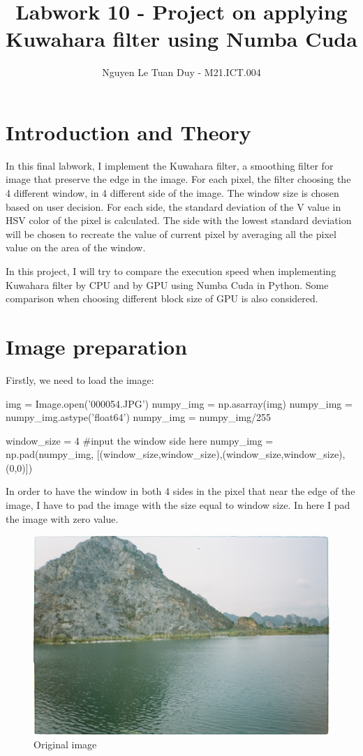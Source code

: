 \documentclass{article}
\title{Labwork 10 - Project on applying Kuwahara filter using Numba Cuda}
\author{Nguyen Le Tuan Duy - M21.ICT.004}
\date{}
\begin{document}
\maketitle
\section{Introduction and Theory}
In this final labwork, I implement the Kuwahara filter, a smoothing filter for image that preserve the edge in the image. For each pixel, the filter choosing the 4 different window, in 4 different side of the image. The window size is chosen based on user decision. For each side, the standard deviation of the V value in HSV color of the pixel is calculated. The side with the lowest standard deviation will be chosen to recreate the value of current pixel by averaging all the pixel value on the area of the window. 

In this project, I will try to compare the execution speed when implementing Kuwahara filter by CPU and by GPU using Numba Cuda in Python. Some comparison when choosing different block size of GPU is also considered.

\section{Image preparation}
Firstly, we need to load the image:
\begin{python}
img = Image.open('000054.JPG')
numpy_img = np.asarray(img)
numpy_img = numpy_img.astype('float64')
numpy_img = numpy_img/255


window_size = 4 #input the window side here
numpy_img = np.pad(numpy_img, [(window_size,window_size),(window_size,window_size),(0,0)])
\end{python}

In order to have the window in both 4 sides in the pixel that near the edge of the image, I have to pad the image with the size equal to window size. In here I pad the image with zero value.

\begin{figure}
    \begin{center}
        \includegraphics[scale=0.06]{000054.JPG}
        \caption{Original image}
    \end{center}
\end{figure}
\end{document}
